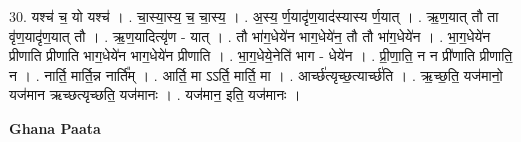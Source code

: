 \documentclass[17pt]{extarticle}
\begin{document}
30. यश्च॑ च॒ यो यश्च॑ । . चा॒स्या॒स्य॒ च॒ चा॒स्य॒ । . अ॒स्य॒ र्ण॒यादृ॑ण॒याद॑स्यास्य र्ण॒यात् । . ऋ॒ण॒यात् तौ ता वृ॑ण॒यादृ॑ण॒यात् तौ । . ऋ॒ण॒यादित्यृ॑ण - यात् । . तौ भा॑ग॒धेये॑न भाग॒धेये॑न॒ तौ तौ भा॑ग॒धेये॑न । . भा॒ग॒धेये॑न प्रीणाति प्रीणाति भाग॒धेये॑न भाग॒धेये॑न प्रीणाति । . भा॒ग॒धेये॒नेति॑ भाग - धेये॑न । . प्री॒णा॒ति॒ न न प्री॑णाति प्रीणाति॒ न । . नार्ति॒ मार्ति॒न्न नार्ति᳚म् । . आर्ति॒ मा ऽऽर्ति॒ मार्ति॒ मा । . आर्च्छ॑त्यृच्छ॒त्यार्च्छ॑ति । . ऋ॒च्छ॒ति॒ यज॑मानो॒ यज॑मान ऋच्छत्यृच्छति॒ यज॑मानः । . यज॑मान॒ इति॒ यज॑मानः । \newline

\textbf{Ghana Paata } \newline
\end{document}
